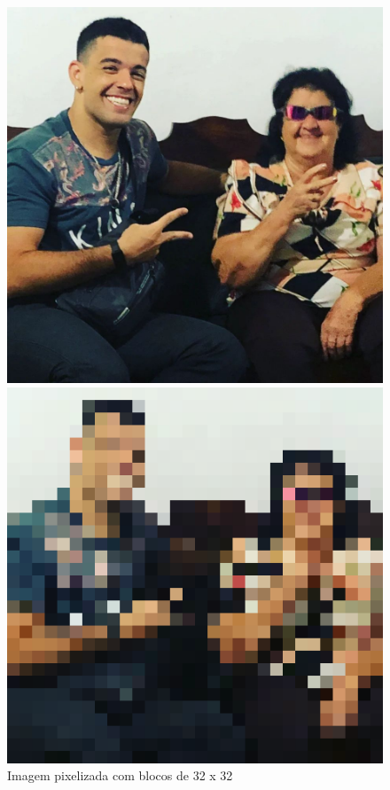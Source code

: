 \begin{figure}[htbp]
    \centering
    \caption{Imagem pixelizada com blocos de 32 x 32}
        \begin{minipage}{0.4\textwidth}
            \includegraphics[width=\textwidth]{figuras/pixelizacao/foto.jpeg}
        \end{minipage}
        \begin{minipage}{0.4\textwidth}
            \includegraphics[width=\textwidth]{figuras/pixelizacao/32.png}
        \end{minipage}
    \label{fig:Imagem pixelizada}
\end{figure}












